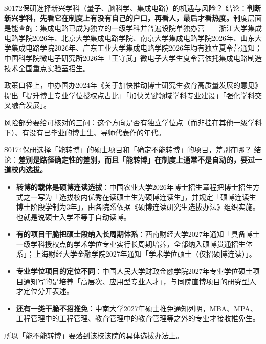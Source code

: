 \begin{qa}{S0172}{保研选择新兴学科（量子、脑科学、集成电路）的机遇与风险？}
结论：\textbf{判断新兴学科，先看它在制度上有没有自己的户口，再看人，最后才看热度。}制度层面是能查的：集成电路已成为独立的一级学科并普遍设院单独办营——浙江大学集成电路学院2026年、北京大学集成电路学院、南京大学集成电路学院2026年、山东大学集成电路学院2026年、广东工业大学集成电路学院2026年均有独立夏令营通知；中国科学院微电子研究所2026年「王守武」微电子大学生夏令营依托集成电路制造技术全国重点实验室招生。

政策口径上，中办国办2024年《关于加快推动博士研究生教育高质量发展的意见》提出「提升博士专业学位授权点占比」「加快关键领域学科专业建设」「强化学科交叉融合发展」。

风险部分要给可核对的三问：这个方向是否有独立学位点（而非挂在其他一级学科下）、有没有已毕业的博士生、导师代表作的年代。
\end{qa}

\begin{qa}{S0174}{保研选择「能转博」的硕士项目和「确定不能转博」的项目，差别在哪？}
结论：\textbf{差别是路径确定性的差别，而且「能转博」在制度上通常不是自动的，要过一道校内选拔。}

\begin{itemize}
  \item \textbf{转博的载体是硕博连读选拔}：中国农业大学2026年博士招生章程把博士招生方式之一写为「选拔校内优秀在读硕士生为硕博连读生」，并规定「硕博连读生博士阶段学制为3年」，由各院系依据《硕博连读研究生选拔办法》组织实施。也就是说硕士入学不等于自动读博。
  \item \textbf{有的项目干脆把硕士段纳入长周期体系}：西南财经大学2027年通知「具备博士一级学科授权点的学术学位专业实行长周期培养，全部纳入硕博贯通招生体系」；上海财经大学金融学院2027年通知「学术学位硕士（仅招硕博连读）」。
  \item \textbf{专业学位项目的定位不同}：中国人民大学财政金融学院2027年专业学位硕士项目通知写的是培养「高层次、应用型专业人才」，与同院直博项目的研究型人才定位分开表述。
  \item \textbf{还有一类干脆不招推免}：中南大学2027年硕士推免通知列明，MBA、MPA、工程管理中的工程管理、教育管理中的教育管理等之外的专业才接收推免生。
\end{itemize}

所以「能不能转博」要落到该校该院的具体选拔办法上。
\end{qa}

